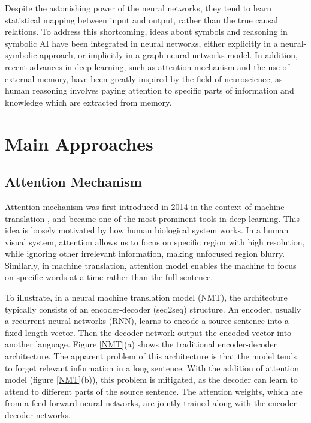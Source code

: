 \documentclass[journal]{IEEEtran}
\begin{document}
Despite the astonishing power of the neural networks, they tend to learn statistical mapping between input and output, rather than the true causal relations. 
To address this shortcoming, ideas about symbols and reasoning in symbolic AI have been integrated in neural networks, 
either explicitly in a neural-symbolic approach, or implicitly in a graph neural networks model.
In addition, recent advances in deep learning, such as attention mechanism and the use of external memory, have been greatly inspired by the field of neuroscience, as 
human reasoning involves paying attention to specific parts of information and knowledge which are extracted from memory.

\section{Main Approaches}
\subsection{Attention Mechanism}
Attention mechanism was first introduced in 2014 in the context of machine translation \cite{bahdanau2014neural}, 
and became one of the most prominent tools in deep learning. 
This idea is loosely motivated by how human biological system works. 
In a human visual system, attention allows us to focus on specific region with high resolution, 
while ignoring other irrelevant information, making unfocused region blurry.
Similarly, in machine translation, attention model enables the machine to focus on specific words at a time 
rather than the full sentence.

To illustrate, in a neural machine translation model (NMT), the architecture typically consists of an encoder-decoder (seq2seq) structure.
An encoder, usually a recurrent neural networks (RNN), learns to encode a source sentence into a fixed length vector.
Then the decoder network output the encoded vector into another language. Figure \ref{NMT}(a) shows the traditional encoder-decoder architecture.
The apparent problem of this architecture is that the model tends to forget relevant information in a long sentence.
With the addition of attention model (figure \ref{NMT}(b)), this problem is mitigated, 
as the decoder can learn to attend to different parts of the source sentence. 
The attention weights, which are from a feed forward neural networks, are jointly trained along with the encoder-decoder networks.
\end{document}
